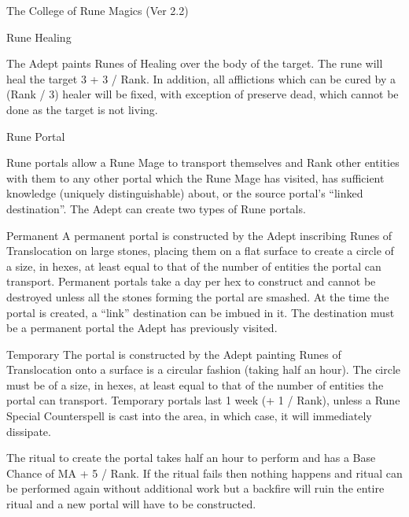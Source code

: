 \begin{Chapter}{The College of Rune Magics (Ver 2.2)}
\begin{ritual}[R-5]{Rune Healing}

\begin{effects}
The Adept paints Runes of Healing over the body of the target. The
rune will heal the target 3 + 3 / Rank.  In addition, all afflictions
which can be cured by a (Rank / 3) healer will be fixed, with
exception of preserve dead, which cannot be done as the target is not
living.
\end{effects}
\end{ritual}

\begin{ritual}[R-6]{Rune Portal}

\begin{effects}
Rune portals allow a Rune Mage to transport themselves and Rank other
entities with them to any other portal which the Rune Mage has
visited, has sufficient knowledge (uniquely distinguishable) about,
or the source portal’s “linked destination”.  The Adept can create two
types of Rune portals.
\begin{Description}
\item[Permanent] A permanent portal is constructed by the Adept
  inscribing Runes of Translocation on large stones, placing them on a
  flat surface to create a circle of a size, in hexes, at least equal
  to that of the number of entities the portal can transport.
  Permanent portals take a day per hex to construct and cannot be
  destroyed unless all the stones forming the portal are smashed. At
  the time the portal is created, a “link” destination can be imbued
  in it.  The destination must be a permanent portal the Adept has
  previously visited.
\item[Temporary] The portal is constructed by the Adept painting Runes
  of Translocation onto a surface is a circular fashion (taking half
  an hour).  The circle must be of a size, in hexes, at least equal to
  that of the number of entities the portal can transport.  Temporary
  portals last 1 week (+ 1 / Rank), unless a Rune Special Counterspell
  is cast into the area, in which case, it will immediately dissipate.
\end{Description}
The ritual to create the portal takes half an hour to perform and has
a Base Chance of MA + 5 / Rank.  If the ritual fails then nothing
happens and ritual can be performed again without additional work but
a backfire will ruin the entire ritual and a new portal will have to
be constructed.


\end{effects}
\end{ritual}
\end{Chapter}
